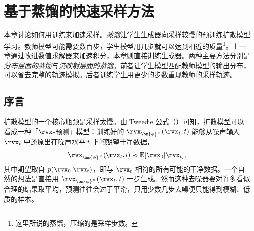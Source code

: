 


\chapter{基于蒸馏的快速采样方法}\label{ch:distillation}

本章讨论如何用训练来加速采样。\emph{蒸馏}让学生生成器向采样较慢的预训练扩散模型学习。教师模型可能需要数百步，学生模型用几步就可以达到相近的质量\footnote{这里所说的蒸馏，压缩的是采样步数。}。上一章通过改进数值求解器来加速积分，本章则直接训练生成器。两种主要方法分别是\emph{分布层面的蒸馏}与\emph{流映射层面的蒸馏}。前者让学生模型匹配教师模型的输出分布，可以省去完整的轨迹模拟。后者训练学生用更少的步数重现教师的采样轨迹。




\section{序言}\label{sec:distillation-prologue}
扩散模型的一个核心瓶颈是采样太慢。由 Tweedie 公式（）可知，扩散模型可以看成一种「$\rvx$-预测」模型：训练好的 $\rvx_{\bm{\phi}^\times}(\rvx_t, t)$ 能够从噪声输入 $\rvx_t$ 中还原出在噪声水平 $t$ 下的期望干净数据，
\[
    \rvx_{\bm{\phi}^\times}(\rvx_t, t) \approx \mathbb{E}[\rvx_0 |\rvx_t],
\]
其中期望取自 $p(\rvx_0 |\rvx_t)$，即与 $\rvx_t$ 相符的所有可能的干净数据。一个自然的想法是直接用 $\rvx_{\bm{\phi}^\times}(\rvx_t, t)$ 一步生成。然而这种去噪器要对许多看似合理的结果取平均，预测往往会过于平滑，只用少数几步去噪便只能得到模糊、低质的样本。

